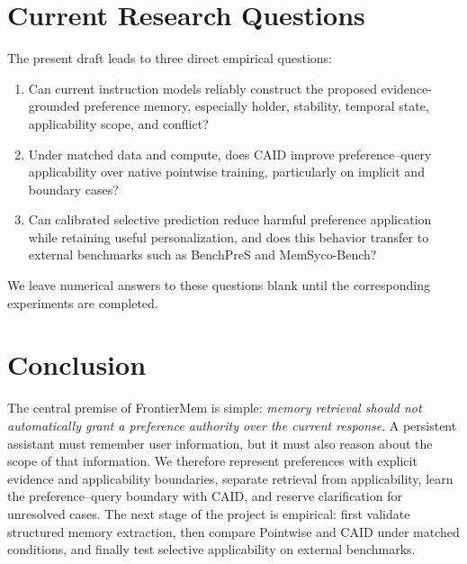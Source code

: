 \documentclass[11pt]{article}
\begin{document}
\section{Current Research Questions}

The present draft leads to three direct empirical questions:
\begin{enumerate}
    \item Can current instruction models reliably construct the proposed evidence-grounded preference memory, especially holder, stability, temporal state, applicability scope, and conflict?
    \item Under matched data and compute, does CAID improve preference--query applicability over native pointwise training, particularly on implicit and boundary cases?
    \item Can calibrated selective prediction reduce harmful preference application while retaining useful personalization, and does this behavior transfer to external benchmarks such as BenchPreS and MemSyco-Bench?
\end{enumerate}
We leave numerical answers to these questions blank until the corresponding experiments are completed.

\section{Conclusion}

The central premise of FrontierMem is simple: \emph{memory retrieval should not automatically grant a preference authority over the current response}. A persistent assistant must remember user information, but it must also reason about the scope of that information. We therefore represent preferences with explicit evidence and applicability boundaries, separate retrieval from applicability, learn the preference--query boundary with CAID, and reserve clarification for unresolved cases. The next stage of the project is empirical: first validate structured memory extraction, then compare Pointwise and CAID under matched conditions, and finally test selective applicability on external benchmarks.
\end{document}
